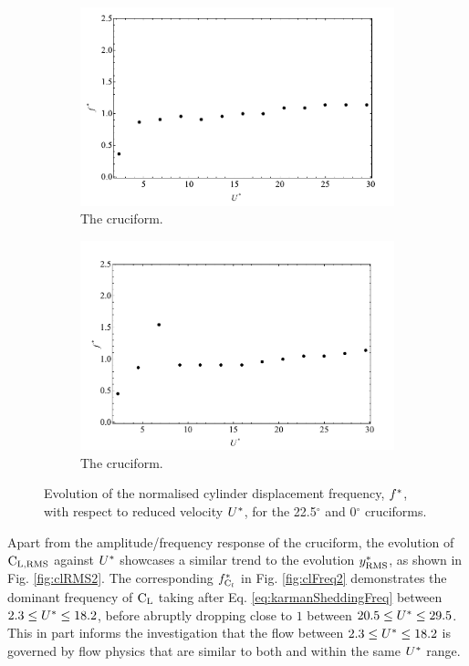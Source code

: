 \documentclass[oneside]{utmthesis}
\begin{document}
\begin{figure}
  \centering
  \begin{subfigure}[h]{1\textwidth}
    \includegraphics[width=\textwidth]{figs/yStrFreq2}
    \caption{The \angtw{} cruciform.}
    \label{fig:yStrFreq2}
  \end{subfigure}
  
  \begin{subfigure}[h]{1\textwidth}
    \includegraphics[width=\textwidth]{figs/yStrFreq1}
    \caption{The \angon{} cruciform.}
    \label{fig:yStrFreq1}
  \end{subfigure}

  \caption{Evolution of the normalised cylinder displacement frequency, $f^{*}$, with respect to reduced velocity $U^{*}$, for the 22.5$^{\circ}$ and 0$^{\circ}$ cruciforms.}
  \label{fig:yStrFreq21}
\end{figure}

Apart from the amplitude/frequency response of the \angtw{} cruciform, the evolution of $\text{C}_{\text{L,RMS}}$ against $U^{*}$ showcases a similar trend to the evolution $y^{*}_{\text{RMS}}$, as shown in Fig. \ref{fig:clRMS2}. The corresponding $f_{\text{C}_{l}}^{*}$ in Fig. \ref{fig:clFreq2} demonstrates the dominant frequency of $\text{C}_{\text{L}}$ taking after Eq. \ref{eq:karmanSheddingFreq} between $2.3 \leq U^{*} \leq 18.2$, before abruptly dropping close to $1$ between $20.5 \leq U^{*} \leq 29.5$. This in part informs the investigation that the flow between $2.3 \leq U^{*} \leq 18.2$ is governed by flow physics that are similar to both \angfo{} and \angth{} within the same $U^{*}$ range.
\end{document}
